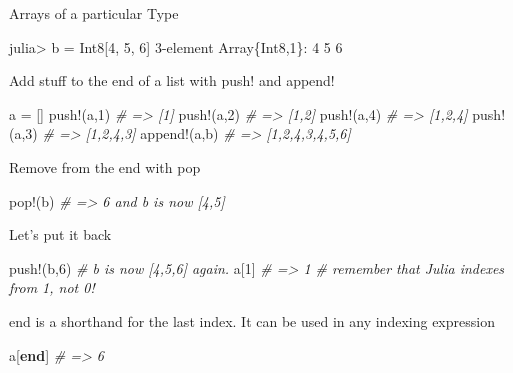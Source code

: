 \documentclass[ignorenonframetext,]{beamer}
\newenvironment{Shaded}{}{}
\newcommand{\KeywordTok}[1]{\textcolor[rgb]{0.00,0.44,0.13}{\textbf{{#1}}}}
\newcommand{\DataTypeTok}[1]{\textcolor[rgb]{0.56,0.13,0.00}{{#1}}}
\newcommand{\FloatTok}[1]{\textcolor[rgb]{0.25,0.63,0.44}{{#1}}}
\newcommand{\CommentTok}[1]{\textcolor[rgb]{0.38,0.63,0.69}{\textit{{#1}}}}
\newcommand{\NormalTok}[1]{{#1}}
\begin{document}
\begin{frame}[fragile]{Arrays of a particular Type}

\begin{Shaded}
\begin{Highlighting}[]
\NormalTok{julia> b = }\DataTypeTok{Int8}\NormalTok{[}\FloatTok{4}\NormalTok{, }\FloatTok{5}\NormalTok{, }\FloatTok{6}\NormalTok{]}
\FloatTok{3}\NormalTok{-element }\DataTypeTok{Array}\NormalTok{\{}\DataTypeTok{Int8}\NormalTok{,}\FloatTok{1}\NormalTok{\}:}
 \FloatTok{4}
 \FloatTok{5}
 \FloatTok{6}
\end{Highlighting}
\end{Shaded}

\end{frame}

\begin{frame}[fragile]{Add stuff to the end of a list with push! and
append!}

\begin{Shaded}
\begin{Highlighting}[]
\NormalTok{a = []}
\NormalTok{push!(a,}\FloatTok{1}\NormalTok{)     }\CommentTok{# => [1]}
\NormalTok{push!(a,}\FloatTok{2}\NormalTok{)     }\CommentTok{# => [1,2]}
\NormalTok{push!(a,}\FloatTok{4}\NormalTok{)     }\CommentTok{# => [1,2,4]}
\NormalTok{push!(a,}\FloatTok{3}\NormalTok{)     }\CommentTok{# => [1,2,4,3]}
\NormalTok{append!(a,b)   }\CommentTok{# => [1,2,4,3,4,5,6]}
\end{Highlighting}
\end{Shaded}

\end{frame}

\begin{frame}[fragile]{Remove from the end with pop}

\begin{Shaded}
\begin{Highlighting}[]
\NormalTok{pop!(b)        }\CommentTok{# => 6 and b is now [4,5]}
\end{Highlighting}
\end{Shaded}

\end{frame}

\begin{frame}[fragile]{Let's put it back}

\begin{Shaded}
\begin{Highlighting}[]
\NormalTok{push!(b,}\FloatTok{6}\NormalTok{)   }\CommentTok{# b is now [4,5,6] again.}
\NormalTok{a[}\FloatTok{1}\NormalTok{] }\CommentTok{# => 1 # remember that Julia indexes from 1, not 0!}
\end{Highlighting}
\end{Shaded}

end is a shorthand for the last index. It can be used in any indexing
expression

\begin{Shaded}
\begin{Highlighting}[]
\NormalTok{a[}\KeywordTok{end}\NormalTok{] }\CommentTok{# => 6}
\end{Highlighting}
\end{Shaded}

\end{frame}
\end{document}
